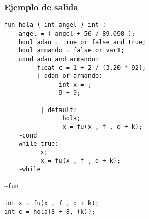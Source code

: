 \documentclass[12pt]{article}
\begin{document}
\subsubsection*{Ejemplo de salida}
\begin{verbatim}
fun hola ( int angel ) int : 
    angel = ( angel + 56 / 89.098 );
    bool adan = true or false and true;
    bool armando = false or var1;
    cond adan and armando:
         float c = 1 + 2 / (3.20 * 92);
         | adan or armando:
               int x = ;
               9 + 9;

          | default:
                hola;
                x = fu(x , f , d + k);            
    ~cond
    while true:
          x;
          x = fu(x , f , d + k);            
    ~while
        
~fun

int x = fu(x , f , d + k);            
int c = hola(8 + 8, (k));
\end{verbatim}
\end{document}
